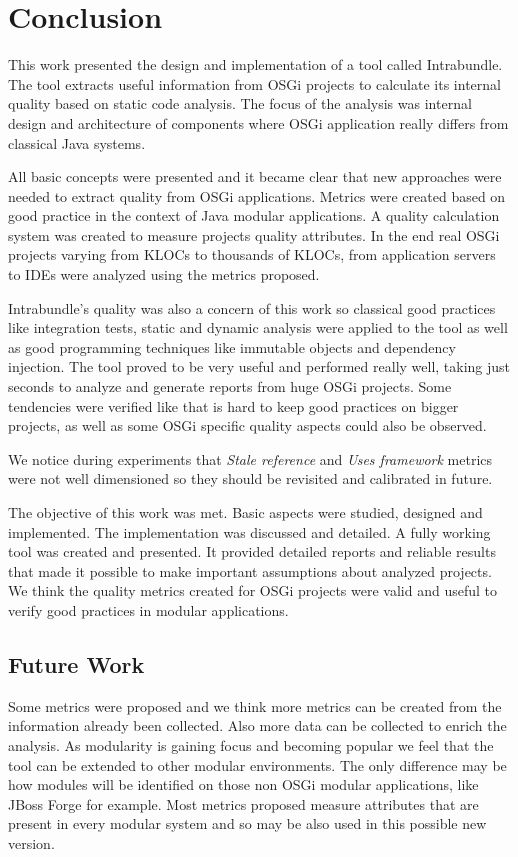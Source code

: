 \chapter{Conclusion}
This work presented the design and implementation of a tool called Intrabundle. The tool extracts useful information from OSGi projects to calculate its internal quality based on static code analysis. The focus of the analysis was internal design and architecture of components where OSGi application really differs from classical Java systems. 

All basic concepts were presented and it became clear that new approaches were needed to extract quality from OSGi applications. Metrics were created based on good practice in the context of Java modular applications. A quality calculation system was created to measure projects quality attributes. In the end real OSGi projects varying from KLOCs to thousands of KLOCs, from application servers to IDEs were analyzed using the metrics proposed.

Intrabundle's quality was also a concern of this work so classical good practices like integration tests, static and dynamic analysis were applied to the tool as well as good programming techniques like immutable objects and dependency injection.      
The tool proved to be very useful and performed really well, taking just seconds to analyze and generate reports from huge OSGi projects. Some tendencies were verified like that is hard to keep good practices on bigger projects, as well as some OSGi specific quality aspects could also be observed. 

We notice during experiments that \emph{Stale reference} and \emph{Uses framework} metrics were not well dimensioned so they should be revisited and calibrated in future.

The objective of this work was met. Basic aspects were studied, designed and implemented. The implementation was discussed and detailed. A fully working tool was created and presented. It provided detailed reports and reliable results that made it possible to make important assumptions about analyzed projects. We think the quality metrics created for OSGi projects were valid and useful to verify good practices in modular applications. 

\section{Future Work}
Some metrics were proposed and we think more metrics can be created from the information already been collected. Also more data can be collected to enrich the analysis. 
As modularity is gaining focus and becoming popular we feel that the tool can be extended to other modular environments. The only difference may be how modules will be identified on those non OSGi modular applications, like JBoss Forge for example. Most metrics proposed measure attributes that are present in every modular system and so may be also used in this possible new version. 

